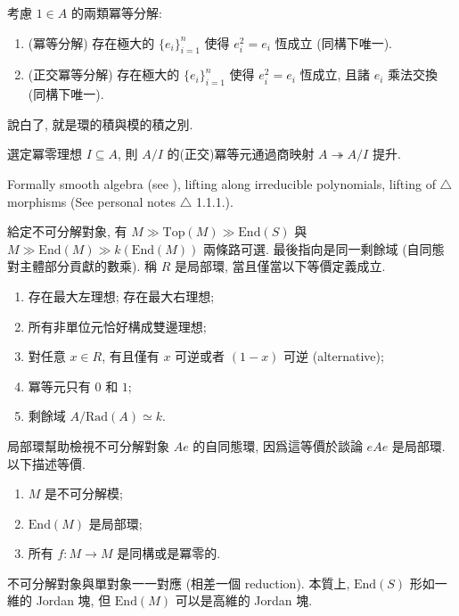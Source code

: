 \begin{example}[冪等分解]
    考慮 $1 ∈ A$ 的兩類冪等分解: 
    \begin{enumerate}
        \item (冪等分解) 存在極大的 $\{e_i\}_{i=1}^n$ 使得 $e_i^2 = e_i$ 恆成立 (同構下唯一). 
        \item (正交冪等分解) 存在極大的 $\{e_i\}_{i=1}^n$ 使得 $e_i^2 = e_i$ 恆成立, 且諸 $e_i$ 乘法交換 (同構下唯一). 
    \end{enumerate}
    \begin{pinked}
        說白了, 就是環的積與模的積之別. 
    \end{pinked}
\end{example}

\begin{remark}
    選定冪零理想 $I ⊆ A$, 則 $A/ I$ 的(正交)冪等元通過商映射 $A ↠ A / I$ 提升.  

    Formally smooth algebra (see \cite{BerestMehrle2017}), lifting along irreducible polynomials, lifting of $\triangle$ morphisms (See personal notes $\triangle$ 1.1.1.). 
\end{remark}

\begin{definition}
    給定不可分解對象, 有 $M ≫ \mathrm{Top}(M) ≫ \mathrm{End}(S)$ 與 $M ≫ \mathrm{End}(M) ≫ k(\mathrm{End}(M))$ 兩條路可選. 最後指向是同一剩餘域 (自同態對主體部分貢獻的數乘). 
    稱 $R$ 是局部環, 當且僅當以下等價定義成立. 
    \begin{enumerate}
        \item 存在最大左理想; 存在最大右理想; 
        \item 所有非單位元恰好構成雙邊理想; 
        \item 對任意 $x ∈ R$, 有且僅有 $x$ 可逆或者 $(1-x)$ 可逆 (alternative); 
        \item 冪等元只有 $0$ 和 $1$; 
        \item 剩餘域 $A/\mathrm{Rad}(A) ≃ k$. 
    \end{enumerate}
\end{definition}

\begin{example}[從單模到不可分解模]
    局部環幫助檢視不可分解對象 $Ae$ 的自同態環, 因爲這等價於談論 $eAe$ 是局部環. 以下描述等價.
\begin{enumerate}
    \item $M$ 是不可分解模; 
    \item $\mathrm{End}(M)$ 是局部環; 
    \item 所有 $f : M → M$ 是同構或是冪零的. 
\end{enumerate}
\end{example}

\begin{remark}
    不可分解對象與單對象一一對應 (相差一個 reduction). 本質上, $\mathrm{End}(S)$ 形如一維的 Jordan 塊, 但 $\mathrm{End}(M)$ 可以是高維的 Jordan 塊.
\end{remark}







